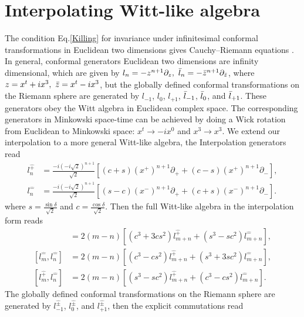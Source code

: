 \documentclass[%
 reprint,
superscriptaddress,
 amsmath,amssymb,
 aps,
]{revtex4-2}
\begin{document}
\section{Interpolating  Witt-like algebra}
\label{sec_Witt-like}
The condition Eq.\eqref{Killing} for invariance under infinitesimal conformal transformations in Euclidean two dimensions gives Cauchy–Riemann equations \cite{Francesco,Blumenhagen}. In general, conformal generators Euclidean two dimensions are infinity dimensional, which are given by $l_n=-z^{n+1}\partial_{z},~\Bar{l}_n=-\Bar{z}^{n+1}\partial_{\Bar{z}}$, where $z=x^t+ix^3,~ \Bar{z}=x^t-ix^3$, but the globally defined conformal transformations on the Riemann sphere are generated by $l_{-1}$, $l_{0}$, $l_{+1}$, $\Bar{l}_{-1}$, $\Bar{l}_{0}$, and $\Bar{l}_{+1}$. These generators obey the Witt algebra in Euclidean complex space. The corresponding generators in Minkowski space-time can be achieved by doing a Wick rotation from Euclidean to Minkowski space: $x^t\longrightarrow -ix^{0}$ and $x^3\longrightarrow x^{3}$. We extend our interpolation to a more general Witt-like algebra, the Interpolation generators read
\begin{align}
    l^{\hat{+}}_n&=\frac{-i(-i\sqrt{2})^{n+1}}{\sqrt{2}}\left[(c+s)\left(x^{+}\right)^{n+1}\partial_{+}+(c-s)\left(x^{+}\right)^{n+1}\partial_{-}\right],\\
    l^{\hat{-}}_n&=\frac{-i(-i\sqrt{2})^{n+1}}{\sqrt{2}}\left[(s-c)\left(x^{-}\right)^{n+1}\partial_{+}+(c+s)\left(x^{-}\right)^{n+1}\partial_{-}\right].
\end{align}
where $s=\frac{\sin{\delta}}{\sqrt{2}}$ and $c=\frac{\cos{\delta}}{\sqrt{2}}$. Then the full Witt-like algebra in the interpolation form reads
\begin{align}
    [l^{\hat{+}}_m,l^{\hat{+}}_n]&=2(m-n)[(c^{3}+3cs^{2})l^{\hat{+}}_{m+n}+(s^{3}-sc^{2})l^{\hat{-}}_{m+n}],\\
    [l^{\hat{-}}_m,l^{\hat{-}}_n]&=2(m-n)[(c^{3}-cs^{2})l^{\hat{+}}_{m+n}+(s^{3}+3sc^{2})l^{\hat{-}}_{m+n}],\\
    [l^{\hat{+}}_m,l^{\hat{-}}_n]&=2(m-n)[(s^{3}-sc^{2})l^{\hat{+}}_{m+n}+(c^{3}-cs^{2})l^{\hat{-}}_{m+n}].
\end{align}
The globally defined conformal transformations on the Riemann sphere are generated by $l^{\hat{\pm}}_{-1}$, $l^{\hat{\pm}}_{0}$, and $l^{\hat{\pm}}_{+1}$, then the explicit commutations read
\end{document}
